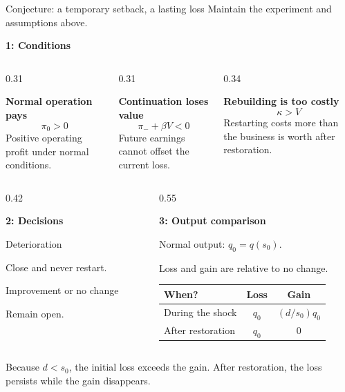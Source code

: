 \documentclass[aspectratio=169,11pt]{beamer}
\newcommand{\kwOrange}[1]{{\color{orange}#1}}
\newcommand{\kwTurq}[1]{{\color{turquoise}#1}}
\newcommand{\labeltext}[1]{{\small\bfseries\color{blue}#1\par}\vspace{1.5mm}}
\newcommand{\takeaway}[1]{\par\vspace{2.5mm}\begingroup\setlength{\fboxsep}{2.5mm}\colorbox{pale}{\begin{minipage}{\dimexpr\linewidth-5mm\relax}\small #1\end{minipage}}\endgroup\par}
\newcommand{\panel}[3]{\begingroup\setlength{\fboxsep}{2.5mm}\colorbox{#1}{\begin{minipage}[t]{\dimexpr#2-5mm\relax}\raggedright #3\end{minipage}}\endgroup}
\begin{document}
\begin{frame}{Conjecture: a temporary setback, a \kwOrange{lasting loss}}
 \small Maintain the experiment and assumptions above.\par\vspace{1mm}
 \labeltext{1: Conditions}
 \begin{columns}[T,onlytextwidth]
 \begin{column}{0.31\textwidth}
 \panel{pale}{\linewidth}{\small\textbf{Normal operation pays}\[\pi_0>0\]\small Positive operating profit under normal conditions.}
 \end{column}
 \begin{column}{0.31\textwidth}
 \panel{pale}{\linewidth}{\small\textbf{Continuation loses value}\[\pi_-+\beta V<0\]\small Future earnings cannot offset the current loss.}
 \end{column}
 \begin{column}{0.34\textwidth}
 \panel{pale}{\linewidth}{\small\textbf{Rebuilding is too costly}\[\kappa>V\]\small Restarting costs more than the business is worth after restoration.}
 \end{column}
 \end{columns}
 \vspace{4mm}
 \begin{columns}[T,onlytextwidth]
 \begin{column}{0.42\textwidth}
 \labeltext{2: Decisions}
 \small\kwOrange{Deterioration}\par Close and never restart.\par\vspace{3mm}
 \kwTurq{Improvement or no change}\par Remain open.
 \end{column}
 \begin{column}{0.55\textwidth}
 \labeltext{3: Output comparison}
 \small Normal output: $q_0=q(s_0)$.\par Loss and gain are relative to no change.
 \vspace{1mm}
 \renewcommand{\arraystretch}{1.3}
 \begin{tabular}{@{}lcc@{}}\toprule
 When? & \kwOrange{Loss} & \kwTurq{Gain}\\\midrule
 During the shock & $q_0$ & $(d/s_0)q_0$\\
 After restoration & $q_0$ & $0$\\\bottomrule
 \end{tabular}
 \end{column}
 \end{columns}
 \takeaway{Because $d<s_0$, the initial loss exceeds the gain. After restoration, the loss persists while the gain disappears.}
\end{frame}
\end{document}
